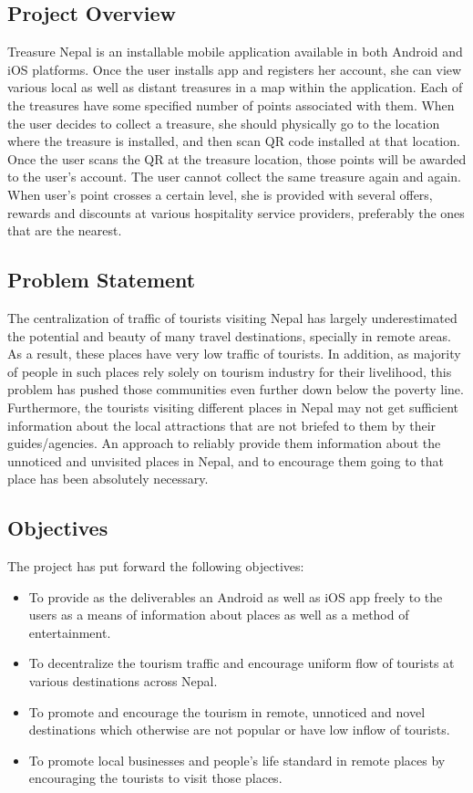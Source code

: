 \documentclass[12pt, a4paper, oneside]{article}
\begin{document}
\subsection{Project Overview}
Treasure Nepal is an installable mobile application available in both Android and iOS platforms. Once the user installs app and registers her account, she can view various local as well as distant treasures in a map within the application. Each of the treasures have some specified number of points associated with them. When the user decides to collect a treasure, she should physically go to the location where the treasure is installed, and then scan QR code installed at that location. Once the user scans the QR at the treasure location, those points will be awarded to the user's account. The user cannot collect the same treasure again and again. When user's point crosses a certain level, she is provided with several offers, rewards and discounts at various hospitality service providers, preferably the ones that are the nearest.

\subsection{Problem Statement}
The centralization of traffic of tourists visiting Nepal has largely underestimated the potential and beauty of many travel destinations, specially in remote areas. As a result, these places have very low traffic of tourists. In addition, as majority of people in such places rely solely on tourism industry for their livelihood, this problem has pushed those communities even further down below the poverty line. Furthermore, the tourists visiting different places in Nepal may not get sufficient information about the local attractions that are not briefed to them by their guides/agencies. An approach to reliably provide them information about the unnoticed and unvisited places in Nepal, and to encourage them going to that place has been absolutely necessary.

\subsection{Objectives}
The project has put forward the following objectives:

\begin{itemize}
	\item To provide as the deliverables an Android as well as iOS app freely to the users as a means of information about places as well as a method of entertainment.
	\item To decentralize the tourism traffic and encourage uniform flow of tourists at various destinations across Nepal.
	\item To promote and encourage the tourism in remote, unnoticed and novel destinations which otherwise are not popular or have low inflow of tourists.
	\item To promote local businesses and people's life standard in remote places by encouraging the tourists to visit those places.
\end{itemize}
\end{document}
